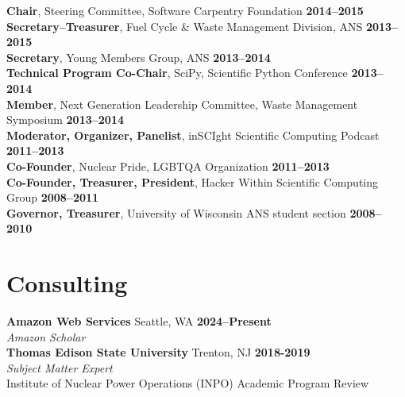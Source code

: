 \documentclass[margin,line]{resume}
\begin{document}
\begin{resume}
                \textbf{Chair}, Steering Committee, Software Carpentry Foundation   \hfill \textbf{2014--2015}\vspace{.5mm}\\%
                \textbf{Secretary--Treasurer}, Fuel Cycle \& Waste Management Division, ANS  \hfill \textbf{2013--2015}\vspace{.5mm}\\%
                \textbf{Secretary}, Young Members Group, ANS  \hfill \textbf{2013--2014}\vspace{.5mm}\\%
                \textbf{Technical Program Co-Chair}, SciPy, Scientific Python Conference   \hfill \textbf{2013--2014}\vspace{.5mm}\\%
                \textbf{Member}, Next Generation Leadership Committee, Waste Management Symposium  \hfill \textbf{2013--2014}\vspace{.5mm}\\%
                \textbf{Moderator, Organizer, Panelist}, inSCIght Scientific Computing Podcast  \hfill \textbf{2011--2013}\vspace{.5mm}\\%
                \textbf{Co-Founder}, Nuclear Pride, LGBTQA Organization  \hfill \textbf{2011--2013}\vspace{.5mm}\\%
                \textbf{Co-Founder, Treasurer, President}, Hacker Within Scientific Computing Group  \hfill \textbf{2008--2011}\vspace{.5mm}\\%
                \textbf{Governor, Treasurer}, University of Wisconsin ANS student section  \hfill \textbf{2008--2010}\vspace{.5mm}%
    \section{\mysidestyle Consulting}

    \textbf{Amazon Web Services} Seattle, WA\hfill
    \textbf{2024--Present}\\
    \textsl{Amazon Scholar}\\

    \textbf{Thomas Edison State University} Trenton, NJ \hfill
    \textbf{2018-2019}\\
    \textsl{Subject Matter Expert} \\
    Institute of Nuclear Power Operations (INPO) Academic Program Review\\



\end{resume}
\end{document}
